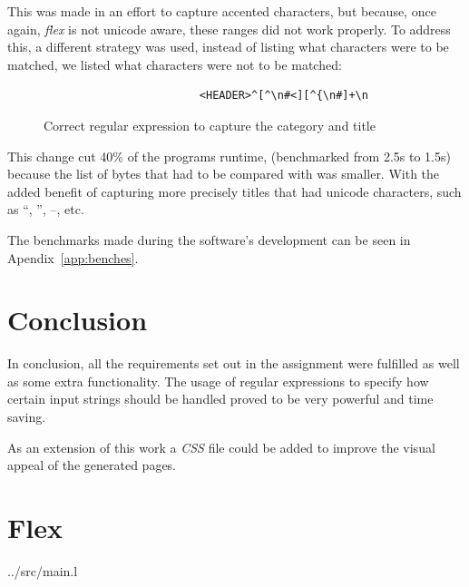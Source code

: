 \documentclass[a4paper]{report}
\begin{document}
This was made in an effort to capture accented characters, but because, once
again, \textit{flex} is not unicode aware, these ranges did not work properly.
To address this, a different strategy was used, instead of listing what
characters were to be matched, we listed what characters were not to be
matched:

\begin{figure}[H]
    \centering
    \begin{verbatim}
                        <HEADER>^[^\n#<][^{\n#]+\n
    \end{verbatim}
    \caption{Correct regular expression to capture the category and title}\label{fig:new-regex}
\end{figure}

This change cut 40\% of the programs runtime, (benchmarked from 2.5s to 1.5s)
because the list of bytes that had to be compared with was smaller. With the
added benefit of capturing more precisely titles that had unicode characters,
such as  ``,  '', --, etc.

The benchmarks made during the software's development can be seen in Apendix~\ref{app:benches}.


\chapter{Conclusion}

In conclusion, all the requirements set out in the assignment were fulfilled as
well as some extra functionality. The usage of regular expressions to specify
how certain input strings should be handled proved to be very powerful and time
saving.

As an extension of this work a \textit{CSS} file could be added to
improve the visual appeal of the generated pages.

\appendix

\chapter{Flex}


{../src/main.l}
\end{document}
